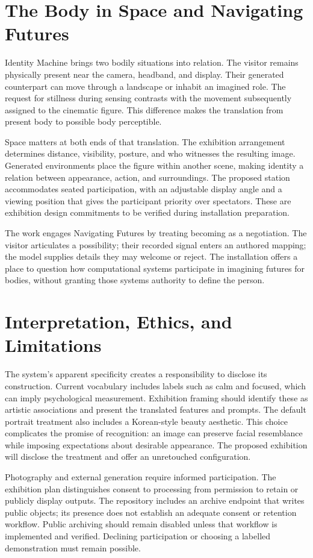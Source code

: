 \documentclass[manuscript,screen,nonacm]{acmart}
\begin{document}
\section{The Body in Space and Navigating Futures}
Identity Machine brings two bodily situations into relation. The visitor remains physically present near the camera, headband, and display. Their generated counterpart can move through a landscape or inhabit an imagined role. The request for stillness during sensing contrasts with the movement subsequently assigned to the cinematic figure. This difference makes the translation from present body to possible body perceptible.

Space matters at both ends of that translation. The exhibition arrangement determines distance, visibility, posture, and who witnesses the resulting image. Generated environments place the figure within another scene, making identity a relation between appearance, action, and surroundings. The proposed station accommodates seated participation, with an adjustable display angle and a viewing position that gives the participant priority over spectators. These are exhibition design commitments to be verified during installation preparation.

The work engages Navigating Futures by treating becoming as a negotiation. The visitor articulates a possibility; their recorded signal enters an authored mapping; the model supplies details they may welcome or reject. The installation offers a place to question how computational systems participate in imagining futures for bodies, without granting those systems authority to define the person.

\section{Interpretation, Ethics, and Limitations}
The system's apparent specificity creates a responsibility to disclose its construction. Current vocabulary includes labels such as calm and focused, which can imply psychological measurement. Exhibition framing should identify these as artistic associations and present the translated features and prompts. The default portrait treatment also includes a Korean-style beauty aesthetic. This choice complicates the promise of recognition: an image can preserve facial resemblance while imposing expectations about desirable appearance. The proposed exhibition will disclose the treatment and offer an unretouched configuration.

Photography and external generation require informed participation. The exhibition plan distinguishes consent to processing from permission to retain or publicly display outputs. The repository includes an archive endpoint that writes public objects; its presence does not establish an adequate consent or retention workflow. Public archiving should remain disabled unless that workflow is implemented and verified. Declining participation or choosing a labelled demonstration must remain possible.
\end{document}
